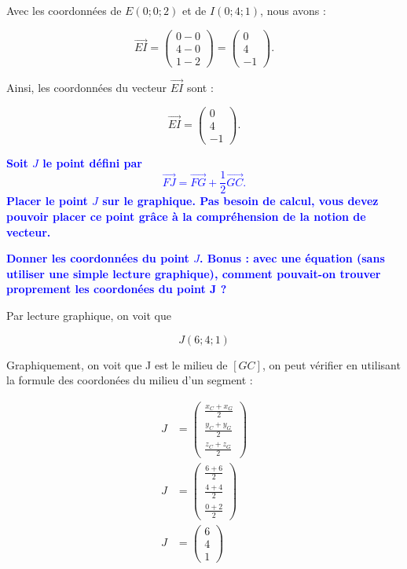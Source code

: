 \documentclass{exam}
\begin{document}
\begin{questions}
Avec les coordonnées de $E(0 ; 0 ; 2)$ et de $I(0 ; 4 ; 1)$, nous avons :

\[
\overrightarrow{EI} = 
\begin{pmatrix}
0 - 0 \\
4 - 0 \\
1 - 2
\end{pmatrix}
=
\begin{pmatrix}
0 \\
4 \\
-1
\end{pmatrix}.
\]

Ainsi, les coordonnées du vecteur $\overrightarrow{EI}$ sont :

\[
\overrightarrow{EI} = 
\begin{pmatrix}
0 \\
4 \\
-1
\end{pmatrix}.
\]

    \question[0.5] \textbf{\textcolor{blue}{Soit $J$ le point défini par 
    \[
    \overrightarrow{FJ} = \overrightarrow{FG} + \frac{1}{2} \overrightarrow{GC}.
    \]
    Placer le point $J$ sur le graphique. Pas besoin de calcul, vous devez pouvoir placer ce point grâce à la compréhension de la notion de vecteur.}}

    \question[0.5] \textbf{\textcolor{blue}{Donner les coordonnées du point $J$. Bonus : avec une équation (sans utiliser une simple lecture graphique), comment pouvait-on trouver proprement les coordonées du point J ?}} 

    Par lecture graphique, on voit que 
    
    \[
    J(6 ; 4; 1)
    \]

    Graphiquement, on voit que J est le milieu de $[GC]$, on peut vérifier en utilisant la formule des coordonées du milieu d'un segment : 

    \begin{align*}
     J &= \begin{pmatrix}
        \frac{x_{C} + x_{G}}{2} \\
        \frac{y_{C} + y_{G}}{2} \\ 
        \frac{z_{C} + z_{G}}{2}
      \end{pmatrix} \\
      J &= \begin{pmatrix}
        \frac{6 + 6}{2} \\
        \frac{4 + 4}{2} \\ 
        \frac{0 + 2}{2}
      \end{pmatrix} \\
      J &= \begin{pmatrix}
        6 \\
        4 \\ 
        1
      \end{pmatrix}
    \end{align*}


\end{questions}
\end{document}
